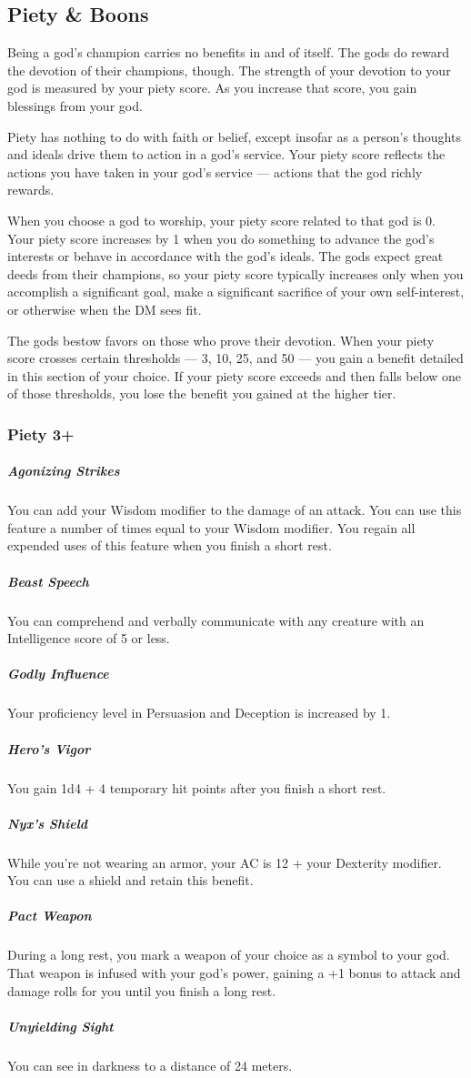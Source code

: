 \subsection*{Piety \& Boons} \label{ssec::pietyandboons}
Being a god's champion carries no benefits in and of itself.
The gods do reward the devotion of their champions, though.
The strength of your devotion to your god is measured by your piety score.
As you increase that score, you gain blessings from your god.

Piety has nothing to do with faith or belief, except insofar as a person's thoughts and ideals drive them to action in a god's service.
Your piety score reflects the actions you have taken in your god's service --- actions that the god richly rewards.

When you choose a god to worship, your piety score related to that god is 0.
Your piety score increases by 1 when you do something to advance the god's interests or behave in accordance with the god's ideals.
The gods expect great deeds from their champions, so your piety score typically increases only when you accomplish a significant goal, make a significant sacrifice of your own self-interest, or otherwise when the DM sees fit.

The gods bestow favors on those who prove their devotion.
When your piety score crosses certain thresholds --- 3, 10, 25, and 50 --- you gain a benefit detailed in this section of your choice.
If your piety score exceeds and then falls below one of those thresholds, you lose the benefit you gained at the higher tier.

\subsubsection{Piety 3+}
    \subparagraph{Agonizing Strikes}
        You can add your Wisdom modifier to the damage of an attack.
        You can use this feature a number of times equal to your Wisdom modifier.
        You regain all expended uses of this feature when you finish a short rest.
    \subparagraph{Beast Speech}
        You can comprehend and verbally communicate with any creature with an Intelligence score of 5 or less.
    \subparagraph{Godly Influence}
        Your proficiency level in Persuasion and Deception is increased by 1.
    \subparagraph{Hero's Vigor}
        You gain 1d4 + 4 temporary hit points after you finish a short rest.
    \subparagraph{Nyx's Shield}
        While you're not wearing an armor, your AC is 12 + your Dexterity modifier.
        You can use a shield and retain this benefit.
    \subparagraph{Pact Weapon}
        During a long rest, you mark a weapon of your choice as a symbol to your god.
        That weapon is infused with your god's power, gaining a +1 bonus to attack and damage rolls for you until you finish a long rest.
    \subparagraph{Unyielding Sight}
        You can see in darkness to a distance of 24 meters.

